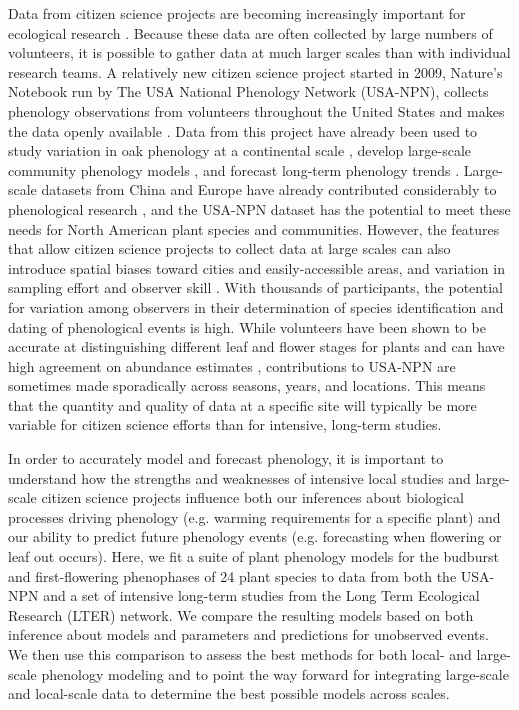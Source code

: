 Data from citizen science projects are becoming increasingly important for ecological research \citep{kelling2009, dickinson2010, tulloch2013}. Because these data are often collected by large numbers of volunteers, it is possible to gather data at much larger scales than with individual research teams. A relatively new citizen science project started in 2009, Nature's Notebook run by The USA National Phenology Network (USA-NPN), collects phenology observations from volunteers throughout the United States and makes the data openly available \citep{npncitation}. Data from this project have already been used to study variation in oak phenology at a continental scale \citep{gerst2017}, develop large-scale community phenology models \citep{melaas2016}, and forecast long-term phenology trends \citep{jeong2013}. Large-scale datasets from China and Europe have already contributed considerably to phenological research \citep{xu2013, olsson2014, basler2016, zhang2017}, and the USA-NPN dataset has the potential to meet these needs for North American plant species and communities. However, the features that allow citizen science projects to collect data at large scales can also introduce spatial biases toward cities and easily-accessible areas, and variation in sampling effort and observer skill \citep{dickinson2010}. With thousands of participants, the potential for variation among observers in their determination of species identification and dating of phenological events is high. While volunteers have been shown to be accurate at distinguishing different leaf and flower stages for plants \citep{fuccillo2015} and can have high agreement on abundance estimates \citep{feldman2018}, contributions to USA-NPN are sometimes made sporadically across seasons, years, and locations. This means that the quantity and quality of data at a specific site will typically be more variable for citizen science efforts than for intensive, long-term studies.

In order to accurately model and forecast phenology, it is important to understand how the strengths and weaknesses of intensive local studies and large-scale citizen science projects influence both our inferences about biological processes driving phenology (e.g. warming requirements for a specific plant) and our ability to predict future phenology events (e.g. forecasting when flowering or leaf out occurs). Here, we fit a suite of plant phenology models for the budburst and first-flowering phenophases of 24 plant species to data from both the USA-NPN and a set of intensive long-term studies from the Long Term Ecological Research (LTER) network. We compare the resulting models based on both inference about models and parameters and predictions for unobserved events. We then use this comparison to assess the best methods for both local- and large-scale phenology modeling and to point the way forward for integrating large-scale and local-scale data to determine the best possible models across scales.

